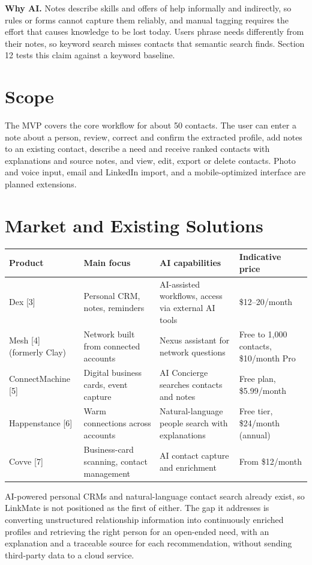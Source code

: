 \documentclass[11pt,letterpaper]{article}
\begin{document}
\textbf{Why AI.} Notes describe skills and offers of help informally and indirectly, so rules or forms cannot capture them reliably, and manual tagging requires the effort that causes knowledge to be lost today. Users phrase needs differently from their notes, so keyword search misses contacts that semantic search finds. Section 12 tests this claim against a keyword baseline.

\section{Scope}
The MVP covers the core workflow for about 50 contacts. The user can enter a note about a person, review, correct and confirm the extracted profile, add notes to an existing contact, describe a need and receive ranked contacts with explanations and source notes, and view, edit, export or delete contacts. Photo and voice input, email and LinkedIn import, and a mobile-optimized interface are planned extensions.

\section{Market and Existing Solutions}
\begin{center}\small
\begin{tabularx}{\linewidth}{@{}lYYl@{}}
  \toprule
  Product & Main focus & AI capabilities & Indicative price \\
  \midrule
  Dex [3] & Personal CRM, notes, reminders & AI-assisted workflows, access via external AI tools & \$12--20/month \\
  Mesh [4] (formerly Clay) & Network built from connected accounts & Nexus assistant for network questions & Free to 1,000 contacts, \$10/month Pro \\
  ConnectMachine [5] & Digital business cards, event capture & AI Concierge searches contacts and notes & Free plan, \$5.99/month \\
  Happenstance [6] & Warm connections across accounts & Natural-language people search with explanations & Free tier, \$24/month (annual) \\
  Covve [7] & Business-card scanning, contact management & AI contact capture and enrichment & From \$12/month \\
  \bottomrule
\end{tabularx}
\end{center}

AI-powered personal CRMs and natural-language contact search already exist, so LinkMate is not positioned as the first of either. The gap it addresses is converting unstructured relationship information into continuously enriched profiles and retrieving the right person for an open-ended need, with an explanation and a traceable source for each recommendation, without sending third-party data to a cloud service.
\end{document}
